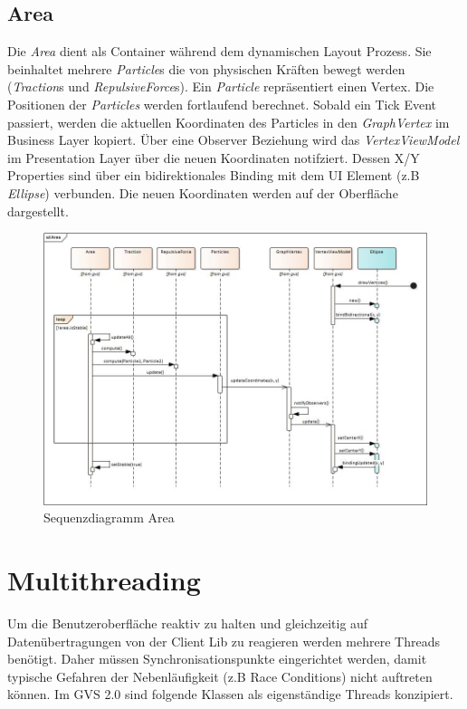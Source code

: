 \documentclass[11pt,a4paper,english,oneside]{book}
\numberwithin{equation}{chapter}
\begin{document}
	\subsection{Area} \label{ssec:area}
		Die \textit{Area} dient als Container während dem dynamischen Layout Prozess. Sie beinhaltet mehrere \textit{Particle}s die von physischen Kräften bewegt werden (\textit{Traction}s und \textit{RepulsiveForce}s). Ein \textit{Particle} repräsentiert einen Vertex. Die Positionen der \textit{Particles} werden fortlaufend berechnet. Sobald ein Tick Event passiert, werden die aktuellen Koordinaten des Particles in den \textit{GraphVertex} im Business Layer kopiert. 	Über eine Observer Beziehung wird das \textit{VertexViewModel} im Presentation Layer über die neuen Koordinaten notifziert. Dessen X/Y Properties sind über ein bidirektionales Binding mit dem UI Element (z.B \textit{Ellipse}) verbunden. Die neuen Koordinaten werden auf der Oberfläche dargestellt. 
		
	\begin{figure}[h!]
		\centering
		\includegraphics[width=0.8\linewidth]{assets/images/sequence_area}
		\caption{Sequenzdiagramm Area}
		\label{fig:sequencearea}
	\end{figure}

	\section{Multithreading} \label{sec:threading}
		Um die Benutzeroberfläche reaktiv zu halten und gleichzeitig auf Datenübertragungen von der Client Lib zu reagieren werden mehrere Threads benötigt. Daher müssen Synchronisationspunkte eingerichtet werden, damit typische Gefahren der Nebenläufigkeit (z.B Race Conditions) nicht auftreten können. Im GVS 2.0 sind folgende Klassen als eigenständige Threads konzipiert.
	
\end{document}
